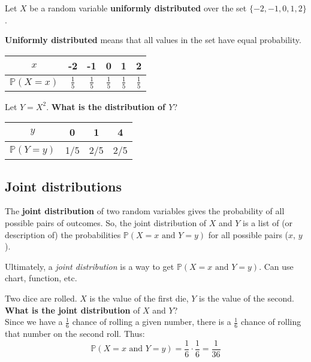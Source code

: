 \documentclass[titlepage, 12pt, leqno]{article}
\begin{document}
\begin{ex}
    Let $X$ be a random variable \textbf{uniformly distributed} over the set
    $\{-2,-1,0,1,2\}$.

    \begin{definition}
        \textbf{Uniformly distributed} means that all values in the set have
        equal probability.
    \end{definition}

    \begin{center}
    \begin{tabular}{c|c c c c c}
        $x$ & -2 & -1 & 0 & 1 & 2 \\
        \hline
        $\mathbb{P}(X=x)$ & $\frac{1}{5}$ &$\frac{1}{5}$&$\frac{1}{5}$
                          &$\frac{1}{5}$&$\frac{1}{5}$
    \end{tabular}
    \end{center}
    \vspace{10px}

    Let $Y = X^2$. \textbf{What is the distribution of $Y$}?

    \vspace{10px}
    \begin{center}
    \begin{tabular}{c|c c c}
        $y$ &0&1&4\\
        \hline
        $\mathbb{P}(Y=y)$&1/5&2/5&2/5
    \end{tabular}
    \end{center}
\end{ex}

\subsection{Joint distributions}
\begin{definition}
    The \textbf{joint distribution} of two random variables gives the probability
    of all possible pairs of outcomes. So, the joint distribution of $X$ and $Y$
    is a list of (or description of) the probabilities 
    $\mathbb{P}(X = x \text{ and } Y = y)$ for all possible pairs ($x$, $y$).
\end{definition}

Ultimately, a \textit{joint distribution} is a way to get $\mathbb{P}(X=x 
\text{ and } Y=y)$. Can use chart, function, etc.

\begin{ex}
    Two dice are rolled. $X$ is the value of the first die, $Y$ is the value of
    the second. \textbf{What is the joint distribution} of $X$ and $Y$?\\[.1in]
    Since we have a $\frac{1}{6} $ chance of rolling a given number, there is a
    $\frac{1}{6} $ chance of rolling that number on the second roll. Thus:
    \[
    \mathbb{P}(X=x \text{ and } Y=y) = \frac{1}{6} \cdot \frac{1}{6} = 
    \boxed{\frac{1}{36}} 
    \]
\end{ex}
\end{document}

